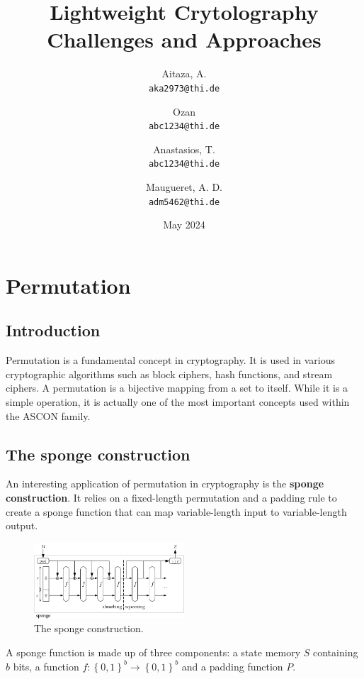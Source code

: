 \documentclass{article}
\title{Lightweight Crytolography Challenges and Approaches}
\author{
    Aitaza, A. \\
    \texttt{aka2973@thi.de}
  \and
    Ozan \\
    \texttt{abc1234@thi.de}   
  \and
    Anastasios, T. \\
    \texttt{abc1234@thi.de}
  \and
    Maugueret, A. D.\\
    \texttt{adm5462@thi.de}
}
\date{May 2024}
\begin{document}
\tableofcontents

\maketitle

\section{Permutation}
\subsection{Introduction}

Permutation is a fundamental concept in cryptography. It is used in various cryptographic algorithms such as block ciphers, hash functions, and stream ciphers. A permutation is a bijective mapping from a set to itself. While it is a simple operation, it is actually one of the most important concepts used within the ASCON family. \par


\subsection{The sponge construction}

An interesting application of permutation in cryptography is the \textbf{sponge construction}. It relies on a fixed-length permutation and a padding rule to create a sponge function that can map variable-length input to variable-length output. \cite{keccak_team} \par 


\begin{figure}[htbp]
  \centering
  \includegraphics[width=0.5\textwidth]{images/Sponge-150.png}
  \caption{The sponge construction.}
  \label{fig:sponge}
\end{figure}

\noindent A sponge function is made up of three components: a state memory $S$ containing $b$ bits, a function $f: \left\{0,1\right\}^b \rightarrow \left\{0,1\right\}^b$ and a padding function $P$.  \cite{keccak_team,sponge_function_2023}
\end{document}
